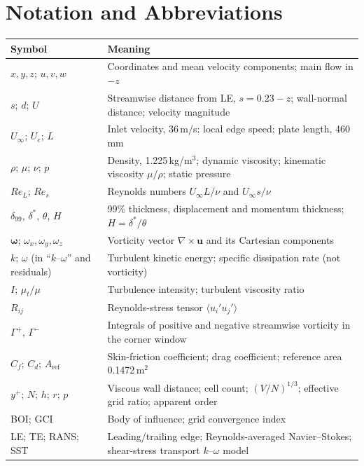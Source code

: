 \documentclass[12pt,a4paper,oneside]{report}
\newcommand{\Uinf}{U_\infty}
\newcommand{\Cd}{C_d}
\newcommand{\Cf}{C_f}
\newcommand{\dn}{\delta_{99}}
\begin{document}
\chapter*{Notation and Abbreviations}
\thispagestyle{plain}
\begin{center}
\small
\begin{tabularx}{\textwidth}{@{}p{}X@{}}
\toprule
Symbol & Meaning \\
\midrule
$x, y, z$; $u, v, w$ & Coordinates and mean velocity components; main flow in $-z$ \\
$s$; $d$; $U$ & Streamwise distance from LE, $s = 0.23 - z$; wall-normal distance; velocity magnitude \\
$\Uinf$; $U_e$; $L$ & Inlet velocity, 36\,m/s; local edge speed; plate length, 460\,mm \\
$\rho$; $\mu$; $\nu$; $p$ & Density, 1.225\,kg/m$^3$; dynamic viscosity; kinematic viscosity $\mu/\rho$; static pressure \\
$Re_L$; $Re_s$ & Reynolds numbers $\Uinf L/\nu$ and $\Uinf s/\nu$ \\
$\dn$, $\delta^*$, $\theta$, $H$ & 99\% thickness, displacement and momentum thickness; $H = \delta^*/\theta$ \\
$\boldsymbol{\omega}$; $\omega_x, \omega_y, \omega_z$ & Vorticity vector $\nabla\times\mathbf{u}$ and its Cartesian components \\
$k$; $\omega$ (in ``$k$--$\omega$'' and residuals) & Turbulent kinetic energy; specific dissipation rate (not vorticity) \\
$I$; $\mu_t/\mu$ & Turbulence intensity; turbulent viscosity ratio \\
$R_{ij}$ & Reynolds-stress tensor $\langle u_i' u_j' \rangle$ \\
$\Gamma^+$, $\Gamma^-$ & Integrals of positive and negative streamwise vorticity in the corner window \\
$\Cf$; $\Cd$; $A_\mathrm{ref}$ & Skin-friction coefficient; drag coefficient; reference area 0.1472\,m$^2$ \\
$y^+$; $N$; $h$; $r$; $p$ & Viscous wall distance; cell count; $(V/N)^{1/3}$; effective grid ratio; apparent order \\
BOI; GCI & Body of influence; grid convergence index \\
LE; TE; RANS; SST & Leading/trailing edge; Reynolds-averaged Navier--Stokes; shear-stress transport $k$--$\omega$ model \\
\bottomrule
\end{tabularx}
\end{center}
\end{document}
